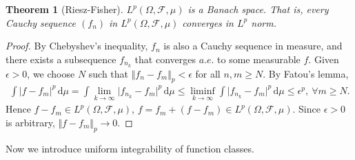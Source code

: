 \documentclass{article}
\numberwithin{equation}{section}
\renewcommand{\d}{\mathrm{d}}
\theoremstyle{plain}
\newtheorem{theorem}{Theorem}[section]
\theoremstyle{definition}
\begin{document}
\begin{theorem}[Riesz-Fisher]\label{thm:1.69} $L^p(\Omega,\mathscr{F},\mu)$ is a Banach space. That is, every Cauchy sequence $(f_n)$ in $L^p(\Omega,\mathscr{F},\mu)$ converges in $L^p$ norm.
\end{theorem}
\begin{proof}
By Chebyshev's inequality, $f_n$ is also a Cauchy sequence in measure, and there exists a subsequence $f_{n_k}$ that converges $a.e.$ to some measurable $f$. Given $\epsilon>0$, we choose $N$ such that $\Vert f_n - f_m\Vert_p < \epsilon$ for all $n,m\geq N$. By Fatou's lemma,
\begin{align*}
	\int \vert f-f_m\vert^p\,\d \mu = \int\lim_{k\to\infty}\vert f_{n_k}-f_m\vert^p\,\d \mu \leq\liminf_{k\to\infty}\int\vert f_{n_k}-f_m\vert^p\,\d \mu\leq\epsilon^p,\ \forall m\geq N.
\end{align*}
Hence $f-f_m\in L^p(\Omega,\mathscr{F},\mu)$, $f=f_m+(f-f_m)\in L^p(\Omega,\mathscr{F},\mu)$. Since $\epsilon>0$ is arbitrary, $\Vert f-f_m\Vert_p\to 0$.
\end{proof}

Now we introduce uniform integrability of function classes.
\end{document}
